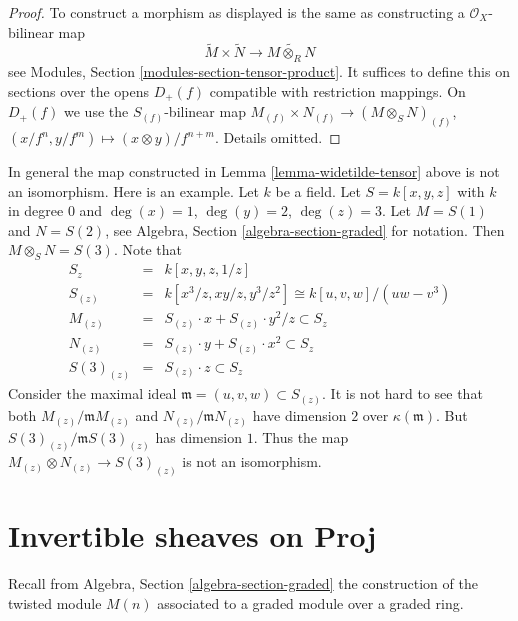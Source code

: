 \begin{proof}
To construct a morphism as displayed is the same as constructing
a $\mathcal{O}_X$-bilinear map
$$
\widetilde M \times \widetilde N
\longrightarrow
\widetilde{M \otimes_R N}
$$
see Modules, Section \ref{modules-section-tensor-product}.
It suffices to define this on sections over the opens $D_{+}(f)$
compatible with restriction mappings. On $D_{+}(f)$ we use the
$S_{(f)}$-bilinear map
$M_{(f)} \times N_{(f)} \to (M \otimes_S N)_{(f)}$,
$(x/f^n, y/f^m) \mapsto (x \otimes y)/f^{n + m}$. Details omitted.
\end{proof}

\begin{remark}
\label{remark-not-isomorphism}
In general the map constructed in Lemma \ref{lemma-widetilde-tensor}
above is not an isomorphism. Here is an example. Let $k$
be a field. Let $S = k[x, y, z]$ with $k$ in degree $0$ and
$\deg(x) = 1$, $\deg(y) = 2$, $\deg(z) = 3$.
Let $M = S(1)$ and $N = S(2)$, see
Algebra, Section \ref{algebra-section-graded}
for notation. Then $M \otimes_S N = S(3)$.
Note that
\begin{eqnarray*}
S_z
& = &
k[x, y, z, 1/z] \\
S_{(z)}
& = &
k[x^3/z, xy/z, y^3/z^2]
\cong
k[u, v, w]/(uw - v^3) \\
M_{(z)} & = & S_{(z)} \cdot x + S_{(z)} \cdot y^2/z \subset S_z \\
N_{(z)} & = & S_{(z)} \cdot y + S_{(z)} \cdot x^2 \subset S_z \\
S(3)_{(z)} & = & S_{(z)} \cdot z \subset S_z
\end{eqnarray*}
Consider the maximal ideal $\mathfrak m = (u, v, w) \subset S_{(z)}$.
It is not hard to see that both $M_{(z)}/\mathfrak mM_{(z)}$
and $N_{(z)}/\mathfrak mN_{(z)}$ have dimension $2$ over
$\kappa(\mathfrak m)$. But
$S(3)_{(z)}/\mathfrak mS(3)_{(z)}$ has dimension $1$.
Thus the map $M_{(z)} \otimes N_{(z)} \to S(3)_{(z)}$ is not
an isomorphism.
\end{remark}









\section{Invertible sheaves on Proj}
\label{section-invertible-on-proj}

\noindent
Recall from Algebra, Section \ref{algebra-section-graded}
the construction of the twisted module $M(n)$ associated
to a graded module over a graded ring.

